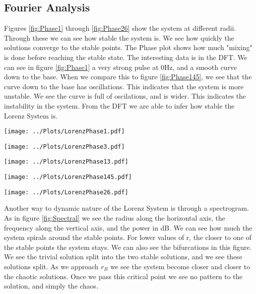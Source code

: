 \documentclass[twocolumn]{myarticle}
\begin{document}
\subsection{Fourier Analysis}
Figures \ref{fig:Phase1} through \ref{fig:Phase26} show the system at different radii. Through these we can see how stable the system is. We see how quickly the solutions converge to the stable points. The Phase plot shows how much "mixing" is done before reaching the stable state. The interesting data is in the DFT. We can see in figure \ref{fig:Phase1} a very strong pulse at 0Hz, and a smooth curve down to the base. When we compare this to figure \ref{fig:Phase145}, we see that the curve down to the base has oscillations. This indicates that the system is more unstable. We see the curve is full of oscilations, and is wider. This indicates the instability in the system. From the DFT we are able to infer how stable the Lorenz System is.

\begin{figure*}[htb]
    \centering
    \texttt{[image: ../Plots/LorenzPhase1.pdf]}
    \caption{Time series, phase space, and DFT of the Lorenz System for R=1}
    \label{fig:Phase1}
\end{figure*}
\begin{figure*}[htb]
    \centering
    \texttt{[image: ../Plots/LorenzPhase3.pdf]}
    \caption{Time series, phase space, and DFT of the Lorenz System for R=3}
    \label{fig:Phase3}
\end{figure*}
\begin{figure*}[htb]
    \centering
    \texttt{[image: ../Plots/LorenzPhase13.pdf]}
    \caption{Time series, phase space, and DFT of the Lorenz System for R=13}
    \label{fig:Phase13}
\end{figure*}
\begin{figure*}[htb]
    \centering
    \texttt{[image: ../Plots/LorenzPhase145.pdf]}
    \caption{Time series, phase space, and DFT of the Lorenz System for R=14.5}
    \label{fig:Phase145}
\end{figure*}
\begin{figure*}[htb]
    \centering
    \texttt{[image: ../Plots/LorenzPhase26.pdf]}
    \caption{Time series, phase space, and DFT of the Lorenz System for R=26}
    \label{fig:Phase26}
\end{figure*}


Another way to dynamic nature of the Lorenz System is through a spectrogram. As in figure \ref{fig:Spectral} we see the radius along the horizontal axis, the frequency along the vertical axis, and the power in dB. We can see how much the system spirals around the stable points. For lower values of r, the closer to one of the stable points the system stays. We can also see the bifurcations in this figure. We see the trivial solution split into the two stable solutions, and we see these solutions split. As we approach $r_{B}$ we see the system become closer and closer to the chaotic solutions. Once we pass this critical point we see no pattern to the solution, and simply the chaos. 
\end{document}
